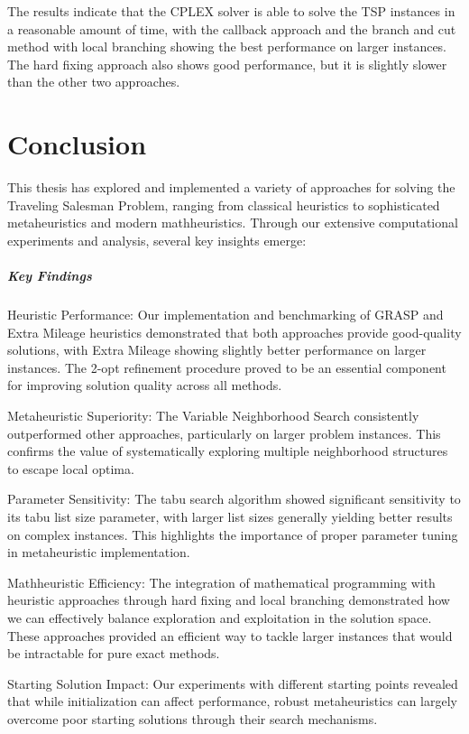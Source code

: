 \documentclass{article}
\begin{document}
The results indicate that the CPLEX solver is able to solve the TSP instances in a reasonable amount of time, with the callback approach and the branch and cut method with local branching
showing the best performance on larger instances. The hard fixing approach also shows good performance,
but it is slightly slower than the other two approaches. 
\newpage


\section{Conclusion}
This thesis has explored and implemented a variety of approaches for solving the Traveling Salesman Problem, ranging from classical heuristics to sophisticated metaheuristics and modern mathheuristics. Through our extensive computational experiments and analysis, several key insights emerge:

\subparagraph{Key Findings}
Heuristic Performance: Our implementation and benchmarking of GRASP and Extra Mileage heuristics demonstrated that both approaches provide good-quality solutions, with Extra Mileage showing slightly better performance on larger instances. The 2-opt refinement procedure proved to be an essential component for improving solution quality across all methods.

Metaheuristic Superiority: The Variable Neighborhood Search consistently outperformed other approaches, particularly on larger problem instances. This confirms the value of systematically exploring multiple neighborhood structures to escape local optima.

Parameter Sensitivity: The tabu search algorithm showed significant sensitivity to its tabu list size parameter, with larger list sizes generally yielding better results on complex instances. This highlights the importance of proper parameter tuning in metaheuristic implementation.

Mathheuristic Efficiency: The integration of mathematical programming with heuristic approaches through hard fixing and local branching demonstrated how we can effectively balance exploration and exploitation in the solution space. These approaches provided an efficient way to tackle larger instances that would be intractable for pure exact methods.

Starting Solution Impact: Our experiments with different starting points revealed that while initialization can affect performance, robust metaheuristics can largely overcome poor starting solutions through their search mechanisms.
\end{document}
